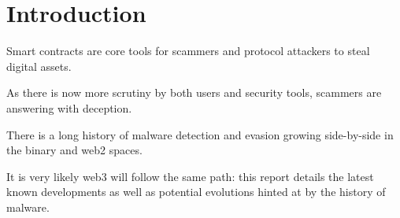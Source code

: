\section{Introduction} \label{chap:introduction}

Smart contracts are core tools for scammers and protocol attackers to steal digital assets.

As there is now more scrutiny by both users and security tools, scammers are answering with deception.

There is a long history of malware detection and evasion growing side-by-side in the binary and web2 spaces.

It is very likely web3 will follow the same path:
this report details the latest known developments as well as potential evolutions hinted at by the history of malware.
